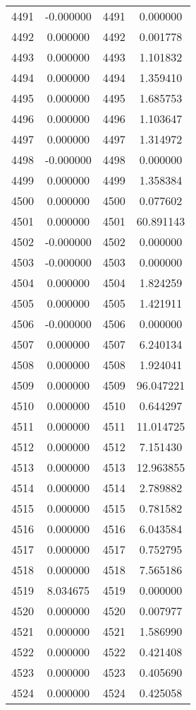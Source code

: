 \documentclass[12pt]{article}
\begin{document}
\begin{longtable}{@{}cccc@{}}
4491 & -0.000000 & 4491 & 0.000000 \\
4492 & 0.000000 & 4492 & 0.001778 \\
4493 & 0.000000 & 4493 & 1.101832 \\
4494 & 0.000000 & 4494 & 1.359410 \\
4495 & 0.000000 & 4495 & 1.685753 \\
4496 & 0.000000 & 4496 & 1.103647 \\
4497 & 0.000000 & 4497 & 1.314972 \\
4498 & -0.000000 & 4498 & 0.000000 \\
4499 & 0.000000 & 4499 & 1.358384 \\
4500 & 0.000000 & 4500 & 0.077602 \\
4501 & 0.000000 & 4501 & 60.891143 \\
4502 & -0.000000 & 4502 & 0.000000 \\
4503 & -0.000000 & 4503 & 0.000000 \\
4504 & 0.000000 & 4504 & 1.824259 \\
4505 & 0.000000 & 4505 & 1.421911 \\
4506 & -0.000000 & 4506 & 0.000000 \\
4507 & 0.000000 & 4507 & 6.240134 \\
4508 & 0.000000 & 4508 & 1.924041 \\
4509 & 0.000000 & 4509 & 96.047221 \\
4510 & 0.000000 & 4510 & 0.644297 \\
4511 & 0.000000 & 4511 & 11.014725 \\
4512 & 0.000000 & 4512 & 7.151430 \\
4513 & 0.000000 & 4513 & 12.963855 \\
4514 & 0.000000 & 4514 & 2.789882 \\
4515 & 0.000000 & 4515 & 0.781582 \\
4516 & 0.000000 & 4516 & 6.043584 \\
4517 & 0.000000 & 4517 & 0.752795 \\
4518 & 0.000000 & 4518 & 7.565186 \\
4519 & 8.034675 & 4519 & 0.000000 \\
4520 & 0.000000 & 4520 & 0.007977 \\
4521 & 0.000000 & 4521 & 1.586990 \\
4522 & 0.000000 & 4522 & 0.421408 \\
4523 & 0.000000 & 4523 & 0.405690 \\
4524 & 0.000000 & 4524 & 0.425058 \\

\end{longtable}
\end{document}
